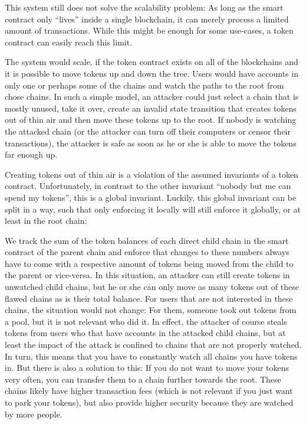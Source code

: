 \documentclass[11pt,letterpaper]{article}
\begin{document}
This system still does not solve the scalability problem: As long as
the smart contract only ``lives'' inside a single blockchain, it can
merely process a limited amount of transactions. While this might be enough
for some use-cases, a token contract can easily reach this limit.

The system would scale, if the token contract exists on all of the blockchains
and it is possible to move tokens up and down the tree. Users would have accounts
in only one or perhaps some of the chains and watch the paths to the root
from chose chains. In such a simple model, an attacker could just select a
chain that is mostly unused, take it over, create an invalid state transition
that creates tokens out of thin air and then move these tokens up to the root.
If nobody is watching the attacked chain (or the attacker can turn off their
computers or censor their transactions), the attacker is safe as soon as he
or she is able to move the tokens far enough up.

Creating tokens out of thin air is a violation of the assumed invariants
of a token contract. Unfortunately, in contrast to the other invariant
``nobody but me can spend my tokens'', this is a global invariant.
Luckily, this global invariant can be split in a way, such that only enforcing
it locally will still enforce it globally, or at least in the root chain:

We track the sum of the token balances of each direct child chain in the smart
contract of the parent chain and enforce that changes to these numbers
always have to come with a respective amount of tokens being moved from
the child to the parent or vice-versa. In this situation, an attacker can still
create tokens in unwatched child chains, but he or she can only move as many tokens
out of these flawed chains as is their total balance. For users that are not interested
in these chains, the situation would not change: For them, someone took out
tokens from a pool, but it is not relevant who did it.
In effect, the attacker of course steals tokens from users who that have
accounts in the attacked child chains, but at least the impact of the attack is
confined to chains that are not properly watched. In turn, this means that you
have to constantly watch all chains you have tokens in. But there is also
a solution to this: If you do not
want to move your tokens very often, you can transfer them to a chain further
towards the root. These chains likely have higher transaction fees (which
is not relevant if you just want to park your tokens), but also
provide higher security because they are watched by more people.
\end{document}
